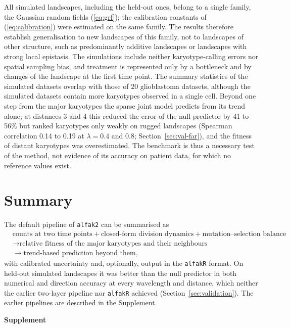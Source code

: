 \documentclass[11pt]{article}
\begin{document}
All simulated landscapes, including the held-out ones, belong to a single
family, the Gaussian random fields (\ref{eq:grf}); the calibration constants
of (\ref{eq:calibration}) were estimated on the same family. The results
therefore establish generalisation to new landscapes of this family, not to
landscapes of other structure, such as predominantly additive landscapes or
landscapes with strong local epistasis. The simulations include neither
karyotype-calling errors nor spatial sampling bias, and treatment is
represented only by a bottleneck and by changes of the landscape at the first
time point. The summary statistics of the simulated datasets overlap with those of
20 glioblastoma datasets, although the simulated datasets contain more
karyotypes observed in a single cell. Beyond one step from the major
karyotypes the sparse joint model predicts from its trend alone; at distances
3 and 4 this reduced the error of the null predictor by 41 to 56\% but ranked
karyotypes only weakly on rugged landscapes (Spearman correlation 0.14 to
0.19 at $\lambda=0.4$ and 0.8; Section~\ref{sec:val-far}), and the fitness of
distant karyotypes was overestimated. The benchmark is thus a necessary test
of the method, not evidence of its accuracy on patient data, for which no
reference values exist.

\section{Summary}

The default pipeline of \texttt{alfak2} can be summarised as
\[
\begin{aligned}
&\text{counts at two time points}
+ \text{closed-form division dynamics}
+ \text{mutation--selection balance}\\
&\longrightarrow
\text{relative fitness of the major karyotypes and their neighbours}\\
&\longrightarrow
\text{trend-based prediction beyond them},
\end{aligned}
\]
with calibrated uncertainty and, optionally, output in the \texttt{alfakR}
format. On held-out simulated landscapes it was better than the null
predictor in both numerical and direction accuracy at every wavelength and
distance, which neither the earlier two-layer pipeline nor \texttt{alfakR}
achieved (Section~\ref{sec:validation}). The earlier pipelines are described
in the Supplement.

\clearpage
\sloppy
\appendix
\renewcommand{\thesection}{S\arabic{section}}
\renewcommand{\theequation}{S\arabic{equation}}
\setcounter{equation}{0}
\begin{center}
{\Large\bfseries Supplement}
\end{center}
\end{document}

